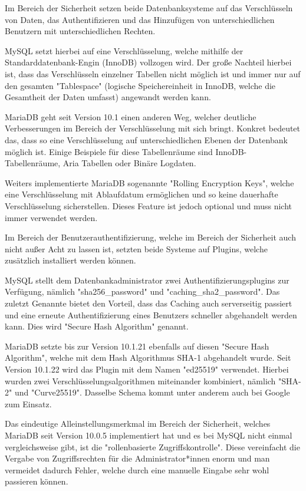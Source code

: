
Im Bereich der Sicherheit setzen beide Datenbanksysteme auf das Verschlüsseln von Daten, das Authentifizieren und das Hinzufügen von unterschiedlichen Benutzern mit unterschiedlichen Rechten. \cite{MariaVsMy}

MySQL setzt hierbei auf eine Verschlüsselung, welche mithilfe der Standarddatenbank-Engin (InnoDB) vollzogen wird. Der große Nachteil hierbei ist, dass das Verschlüsseln einzelner Tabellen nicht möglich ist und immer nur auf den gesamten "Tablespace" (logische Speichereinheit in InnoDB, welche die Gesamtheit der Daten umfasst) angewandt werden kann. \cite{MariaVsMy}

MariaDB geht seit Version 10.1 einen anderen Weg, welcher deutliche Verbesserungen im Bereich der Verschlüsselung mit sich bringt. Konkret bedeutet das, dass so eine Verschlüsselung auf unterschiedlichen Ebenen der Datenbank möglich ist. Einige Beispiele für diese Tabellenräume sind InnoDB-Tabellenräume, Aria Tabellen oder Binäre Logdaten. \cite{MariaVsMy}

Weiters implementierte MariaDB sogenannte "Rolling Encryption Keys", welche eine Verschlüsselung mit Ablaufdatum ermöglichen und so keine dauerhafte Verschlüsselung sicherstellen. Dieses Feature ist jedoch optional und muss nicht immer verwendet werden. \cite{MariaVsMy}

Im Bereich der Benutzerauthentifizierung, welche im Bereich der Sicherheit auch nicht außer Acht zu lassen ist, setzten beide Systeme auf Plugins, welche zusätzlich installiert werden können. \cite{MariaVsMy}

MySQL stellt dem Datenbankadministrator zwei Authentifizierungsplugins zur Verfügung, nämlich "sha256\_password" und "caching\_sha2\_password". Das zuletzt Genannte bietet den Vorteil, dass das Caching auch serverseitig passiert und eine erneute Authentifizierung eines Benutzers schneller abgehandelt werden kann. Dies wird "Secure Hash Algorithm" genannt.

MariaDB setzte bis zur Version 10.1.21 ebenfalls auf diesen "Secure Hash Algorithm", welche mit dem Hash Algorithmus SHA-1 abgehandelt wurde. Seit Version 10.1.22 wird das Plugin mit dem Namen "ed25519" verwendet. Hierbei wurden zwei Verschlüsselungsalgorithmen miteinander kombiniert, nämlich "SHA-2" und "Curve25519". Dasselbe Schema kommt unter anderem auch bei Google zum Einsatz. \cite{MariaVsMy}

Das eindeutige Alleinstellungsmerkmal im Bereich der Sicherheit, welches MariaDB seit Version 10.0.5 implementiert hat und es bei MySQL nicht einmal vergleichsweise gibt, ist die "rollenbasierte Zugriffskontrolle". Diese vereinfacht die Vergabe von Zugriffsrechten für die Administrator*innen enorm und man vermeidet dadurch Fehler, welche durch eine manuelle Eingabe sehr wohl passieren können. \cite{MariaVsMy}

